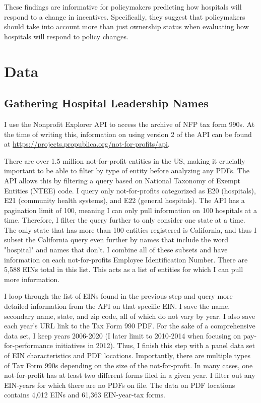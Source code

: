 \documentclass[12pt]{article}
\begin{document}
     These findings are informative for policymakers predicting how hospitals will respond to a change in incentives. Specifically, they suggest that policymakers should take into account more than just ownership status when evaluating how hospitals will respond to policy changes. 

	
	\newpage

    \printbibliography

\appendix

 \section{Data}\label{appendixdata}

\subsection{Gathering Hospital Leadership Names}

I use the Nonprofit Explorer API to access the archive of NFP tax form 990s. At the time of writing this, information on using version 2 of the API can be found at \hyperlink{https://projects.propublica.org/not-for-profits/api}{https://projects.propublica.org/not-for-profits/api}. 
    
There are over 1.5 million not-for-profit entities in the US, making it crucially important to be able to filter by type of entity before analyzing any PDFs. The API allows this by filtering a query based on National Taxonomy of Exempt Entities (NTEE) code. I query only not-for-profits categorized as E20 (hospitals), E21 (community health systems), and E22 (general hospitals). The API has a pagination limit of 100, meaning I can only pull information on 100 hospitals at a time. Therefore, I filter the query further to only consider one state at a time. The only state that has more than 100 entities registered is California, and thus I subset the California query even further by names that include the word "hospital" and names that don't. I combine all of these subsets and have information on each not-for-profits Employee Identification Number. There are 5,588 EINs total in this list. This acts as a list of entities for which I can pull more information. 

I loop through the list of EINs found in the previous step and query more detailed information from the API on that specific EIN. I save the name, secondary name, state, and zip code, all of which do not vary by year. I also save each year's URL link to the Tax Form 990 PDF. For the sake of a comprehensive data set, I keep years 2006-2020 (I later limit to 2010-2014 when focusing on pay-for-performance initiatives in 2012). Thus, I finish this step with a panel data set of EIN characteristics and PDF locations. Importantly, there are multiple types of Tax Form 990s depending on the size of the not-for-profit. In many cases, one not-for-profit has at least two different forms filed in a given year. I filter out any EIN-years for which there are no PDFs on file. The data on PDF locations contains 4,012 EINs and 61,363 EIN-year-tax forms.
\end{document}
